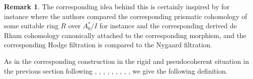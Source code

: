 \documentclass[11pt]{book}
\theoremstyle{definition}
\newtheorem{remark}[theorem]{Remark}
\numberwithin{equation}{section}
\begin{document}
\begin{remark}
The corresponding idea behind this is certainly inspired by \cite{12LL} for instance where the authors compared the corresponding prismatic cohomology of some suitable ring $R$ over $A^*_0/I$ for instance and the corresponding derived de Rham cohomology canonically attached to the corresponding morphism, and the corresponding Hodge filtration is compared to the Nygaard filtration. 	
\end{remark}












\indent As in the corresponding construction in the rigid and pseudocoherent situation in the previous section following \cite[Chapitre 3]{12An1}, \cite{12An2}, \cite[Chapter 5, Chapter 6, Chapter 7]{12B1}, \cite[Chapter 1]{12Bei}, \cite[Chapter 5]{12G1}, \cite[Chapter 3, Chapter 4]{12GL}, \cite[Chapitre II, Chapitre III]{12Ill1}, \cite[Chapitre VIII]{12Ill2}, \cite[Chapter 8]{12O}, \cite[Section 4]{12Qui} we give the following definition. 
\end{document}

